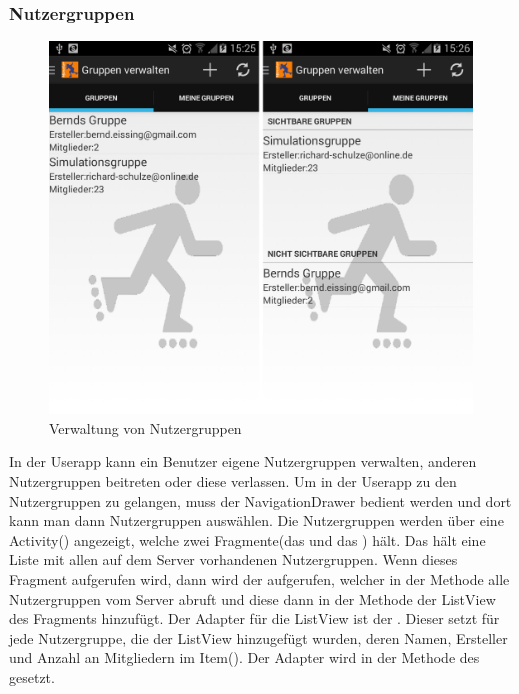 \subsubsection{Nutzergruppen}

\begin{figure}[htb]
\centering
\includegraphics[width=12cm]{graphics/Usergroups_Fragments.png}
\caption{Verwaltung von Nutzergruppen}
\label{fig:usergroup_fragments}
\end{figure}

In der Userapp kann ein Benutzer eigene Nutzergruppen verwalten, anderen Nutzergruppen beitreten oder diese verlassen. Um in der Userapp zu den Nutzergruppen zu gelangen, muss der NavigationDrawer bedient werden und dort kann man dann Nutzergruppen auswählen. Die Nutzergruppen werden über eine Activity() angezeigt, welche zwei Fragmente(das  und das ) hält. Das  hält eine Liste mit allen auf dem Server vorhandenen Nutzergruppen. Wenn dieses Fragment aufgerufen wird, dann wird der  aufgerufen, welcher in der  Methode alle Nutzergruppen vom Server abruft und diese dann in der  Methode der ListView des Fragments hinzufügt. Der Adapter für die ListView ist der . Dieser setzt für jede Nutzergruppe, die der ListView hinzugefügt wurden, deren Namen, Ersteller und Anzahl an Mitgliedern im Item(). Der Adapter wird in der  Methode des  gesetzt.\\
\FloatBarrier

